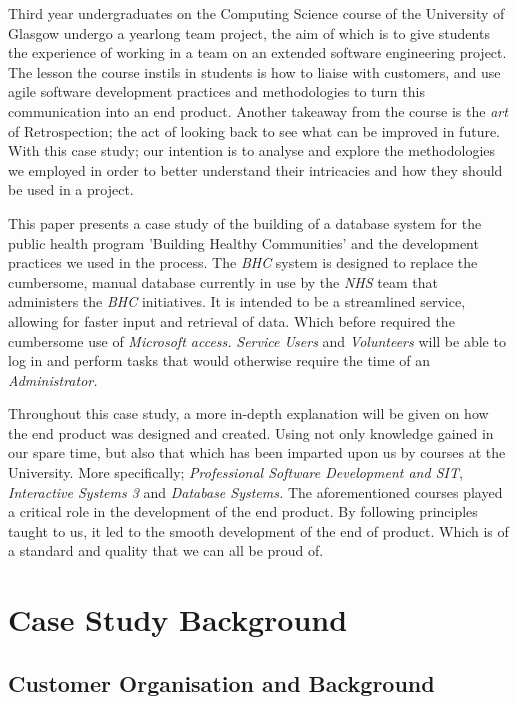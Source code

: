 \documentclass{l3proj}
\begin{document}
Third year undergraduates on the Computing Science course of the University of Glasgow undergo a yearlong team project, the aim of which is to give students the experience of working in a team on an extended software engineering project. The lesson the course instils in students is how to liaise with customers, and use agile software development practices and methodologies to turn this communication into an end product. Another takeaway from the course is the \textit{art} of Retrospection; the act of looking back to see what can be improved in future. With this case study; our intention is to analyse and explore the methodologies we employed in order to better understand their intricacies and how they should be used in a project.

This paper presents a case study of the building of a database system for the public health program 'Building Healthy Communities' and the development practices we used in the process. The \textit{BHC} system is designed to replace the cumbersome, manual database currently in use by the \textit{NHS} team that administers the \textit{BHC} initiatives. It is intended to be a streamlined service, allowing for faster input and retrieval of data. Which before required the cumbersome use of \textit{Microsoft access.} \textit{Service Users} and \textit{Volunteers} will be able to log in and perform tasks that would otherwise require the time of an \textit{Administrator.}

Throughout this case study, a more in-depth explanation will be given on how the end product was designed and created. Using not only knowledge gained in our spare time, but also that which has been imparted upon us by courses at the University. More specifically; \textit{Professional Software Development and SIT}, \textit{Interactive Systems 3} and \textit{Database Systems.} The aforementioned courses played a critical role in the development of the end product. By following principles taught to us, it led to the smooth development of the end of product. Which is of a standard and quality that we can all be proud of.
\section{Case Study Background}

\subsection{Customer Organisation and Background}
\label{customer}
\end{document}
